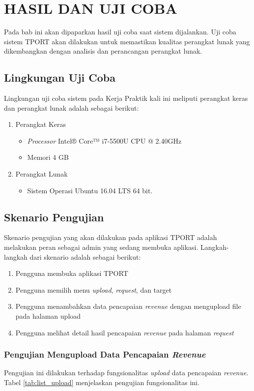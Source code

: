\chapter{HASIL DAN UJI COBA}
Pada bab ini akan dipaparkan hasil uji coba saat sistem dijalankan. Uji coba sistem TPORT akan dilakukan untuk memastikan kualitas perangkat lunak yang dikembangkan dengan analisis dan perancangan perangkat lunak.
\section{Lingkungan Uji Coba}
Lingkungan uji coba sistem pada Kerja Praktik kali ini meliputi perangkat keras dan perangkat lunak adalah sebagai berikut:
\begin{enumerate}
	\item Perangkat Keras
	\begin{itemize}
		\item \textit{Processor} Intel® Core™ i7-5500U CPU @ 2.40GHz
		\item Memori 4 GB
	\end{itemize}
	\item Perangkat Lunak
	\begin{itemize}
		\item Sistem Operasi Ubuntu 16.04 LTS 64 bit.
	\end{itemize}
\end{enumerate}

\section{Skenario Pengujian}
Skenario pengujian yang akan dilakukan pada aplikasi TPORT adalah melakukan peran sebagai admin yang sedang membuka aplikasi. Langkah-langkah dari skenario adalah sebagai berikut:
	\begin{enumerate}
	\item Pengguna membuka aplikasi TPORT
	\item Pengguna memilih menu \textit{upload}, \textit{request}, dan target
	\item Pengguna menambahkan data pencapaian \textit{revenue} dengan mengupload file pada halaman upload
	\item Pengguna melihat detail hasil pencapaian \textit{revenue} pada halaman \textit{request}
	\end{enumerate}
	
\subsection{Pengujian Mengupload Data Pencapaian \textit{Revenue}}
Pengujian ini dilakukan terhadap fungsionalitas \textit{upload} data pencapaian \textit{revenue}. Tabel \ref{tab:list_upload} menjelaskan pengujian fungsionalitas ini.

